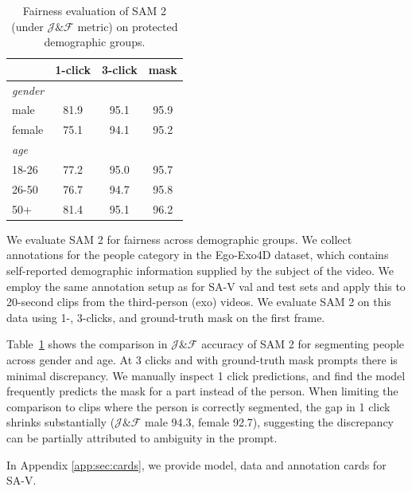 \documentclass[]{fairmeta}
\newcommand{\tabref}[1]{Table~\ref{#1}}
\newcommand{\jf}{$\mathcal{J}\&\mathcal{F}$\xspace}
\begin{document}
\begin{table}
\vspace{-25pt}
        \centering
        \small
        \vspace{-4pt}
        \begin{tabular}{@{}lccc}
            & 1-click & 3-click & mask \\ %
        \midrule
         \textit{gender} \\
         male & 81.9 & 95.1 & 95.9 \\
         female & 75.1 & 94.1 &  95.2 \\
        \midrule
         \textit{age}  \\
         18-26 & 77.2 & 95.0 & 95.7 \\
         26-50 & 76.7 & 94.7 & 95.8 \\
         50+  & 81.4  & 95.1 & 96.2 \\
        \end{tabular}
    \vspace{-10pt}
    \caption{Fairness evaluation of SAM 2 (under \jf metric) on protected demographic groups. %
    }
    \label{tab:tab-savi-fairness}
\vspace{-10pt}
\end{table}

We evaluate SAM 2 for fairness across demographic groups. We collect annotations for the people category in the Ego-Exo4D \citep{grauman2023ego} dataset, which contains self-reported demographic information supplied by the subject of the video. We employ the same annotation setup as for SA-V val and test sets and apply this to 20-second clips from the third-person (exo) videos. We evaluate SAM 2 on this data using 1-, 3-clicks, and ground-truth mask on the first frame. 

\tabref{tab:tab-savi-fairness} shows the comparison in \jf accuracy of SAM 2 for segmenting people across gender and age.  At 3 clicks and with ground-truth mask prompts there is minimal discrepancy. We manually inspect 1 click predictions, and find the model frequently predicts the mask for a part instead of the person. When limiting the comparison to clips where the person is correctly segmented, the gap in 1 click shrinks substantially (\jf male 94.3, female 92.7), suggesting the discrepancy can be partially attributed to ambiguity in the prompt. 

In Appendix \ref{app:sec:cards}, we provide model, data and annotation cards for SA-V.
\end{document}

